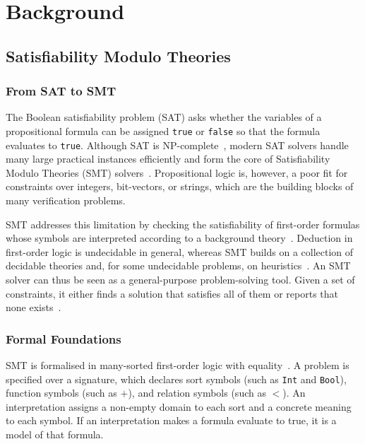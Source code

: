
\section{Background} 
\subsection{Satisfiability Modulo Theories}
\label{subsec:smt-basics}

\subsubsection{From SAT to SMT}
The Boolean satisfiability problem (SAT) asks whether the variables of a propositional formula can be assigned \texttt{true} or \texttt{false} so that the formula evaluates to \texttt{true}. Although SAT is NP-complete~\cite{cook1971complexity}, modern SAT solvers handle many large practical instances efficiently and form the core of Satisfiability Modulo Theories (SMT) solvers~\cite{demoura2011smt}. Propositional logic is, however, a poor fit for constraints over integers, bit-vectors, or strings, which are the building blocks of many verification problems.

SMT addresses this limitation by checking the satisfiability of first-order formulas whose symbols are interpreted according to a background theory~\cite{barrett2018smt}. Deduction in first-order logic is undecidable in general, whereas SMT builds on a collection of decidable theories and, for some undecidable problems, on heuristics~\cite{barrett2024tutorial}. An SMT solver can thus be seen as a general-purpose problem-solving tool. Given a set of constraints, it either finds a solution that satisfies all of them or reports that none exists~\cite{barrett2024tutorial}.

\subsubsection{Formal Foundations}
SMT is formalised in many-sorted first-order logic with equality~\cite{barrett2024tutorial}. A problem is specified over a signature, which declares sort symbols (such as \texttt{Int} and \texttt{Bool}), function symbols (such as $+$), and relation symbols (such as $<$). An interpretation assigns a non-empty domain to each sort and a concrete meaning to each symbol. If an interpretation makes a formula evaluate to true, it is a model of that formula.


